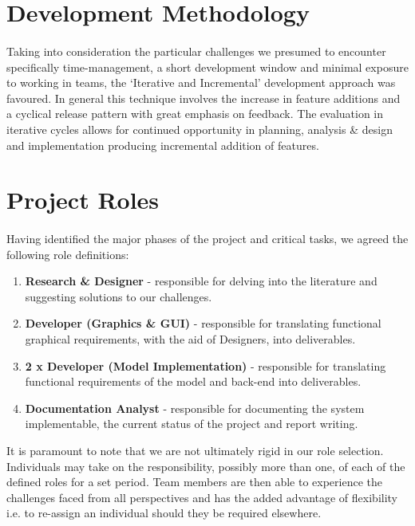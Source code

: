 \documentclass[11pt,a4paper]{article}
\begin{document}
\section{Development Methodology}
\paragraph{}
Taking into consideration the particular challenges we presumed to encounter specifically time-management, a short development window and minimal exposure to working in teams, the ‘Iterative and Incremental’ development approach was favoured.  In general this technique involves the increase in feature additions and a cyclical release pattern with great emphasis on feedback.  The evaluation in iterative cycles allows for continued opportunity in planning, analysis \& design and implementation producing incremental addition of features.

\section{Project Roles}
\paragraph{}
Having identified the major phases of the project and critical tasks, we agreed the following role definitions:

\begin{enumerate}
  \item \textbf{Research \& Designer} - responsible for delving into the literature and suggesting solutions to our challenges.
  \item \textbf{Developer (Graphics \& GUI)} - responsible for translating functional graphical requirements, with the aid of Designers, into deliverables.
  \item \textbf{2 x Developer (Model Implementation)} - responsible for translating functional requirements of the model and back-end into deliverables.
  \item \textbf{Documentation Analyst} - responsible for documenting the system implementable, the current status of the project and report writing.
\end{enumerate}

It is paramount to note that we are not ultimately rigid in our role selection.  Individuals may take on the responsibility, possibly more than one, of each of the defined roles for a set period.  Team members are then able to experience the challenges faced from all perspectives and has the added advantage of flexibility i.e. to re-assign an individual should they be required elsewhere.
\end{document}
